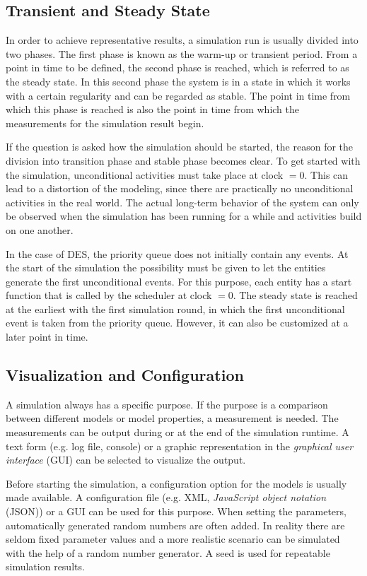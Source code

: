 \documentclass[english,version-2019-11]{uzl-thesis}
\begin{document}
\subsection{Transient and Steady State}
In order to achieve representative results,
a simulation run is usually divided into two phases.
The first phase is known as the warm-up or transient period.
From a point in time to be defined,
the second phase is reached, which is referred
to as the steady state. In this second phase
the system is in a state in which it works
with a certain regularity and can be regarded
as stable. The point in time from which this
phase is reached is also the point in time
from which the measurements for the
simulation result begin.~\cite{SimJavaThesis}

If the question is asked how the simulation
should be started, the reason for the division
into transition phase and stable phase becomes clear.
To get started with the simulation,
unconditional activities must take place at clock $= 0$.
This can lead to a distortion of the modeling,
since there are practically no unconditional
activities in the real world.
The actual long-term behavior of the system can only
be observed when the simulation has been running
for a while and activities build on one another.

In the case of DES,
the priority queue does not initially contain
any events. At the start of the simulation the
possibility must be given to let the entities
generate the first unconditional events. For this
purpose, each entity has a start function that
is called by the scheduler at clock $= 0$.
The steady state is reached at the earliest with
the first simulation round, in which the first
unconditional event is taken from the priority
queue. However, it can also be customized
at a later point in time.

\subsection{Visualization and Configuration}
A simulation always has a specific purpose. If the purpose is a comparison between different models or model properties, a measurement is needed. The measurements can be output during or at the end of the simulation runtime. A text form (e.g. log file, console) or a graphic representation in the \emph{graphical user interface} (GUI) can be selected to visualize the output.

Before starting the simulation, a configuration option for the models is usually made available. A configuration file (e.g. XML, \emph{JavaScript object notation} (JSON)) or a GUI can be used for this purpose.
When setting the parameters, automatically generated random numbers are often added. In reality there are seldom fixed parameter values and a more realistic scenario can be simulated with the help of a random number generator. A seed is used for repeatable simulation results.
\end{document}
